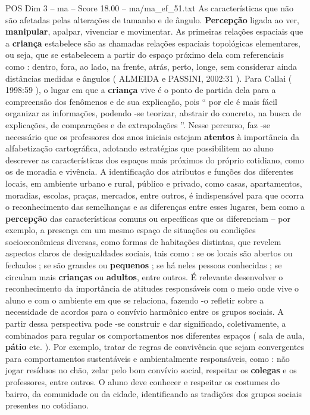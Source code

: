 \begin{textsample}{POS Dim 3 – ma – Score 18.00 – ma/ma\_ef\_51.txt}
As características que não são afetadas pelas alterações de tamanho e de ângulo. \textbf{Percepção} ligada ao ver, \textbf{manipular}, apalpar, vivenciar e movimentar.
As primeiras relações espaciais que a \textbf{criança} estabelece são as chamadas relações espaciais topológicas elementares, ou seja, que se estabelecem a partir do espaço próximo dela com referenciais como : dentro, fora, ao lado, na frente, atrás, perto, longe, sem considerar ainda distâncias medidas e ângulos ( ALMEIDA e PASSINI, 2002:31 ).
Para Callai ( 1998:59 ), o lugar em que a \textbf{criança} vive é o ponto de partida dela para a compreensão dos fenômenos e de sua explicação, pois “ por ele é mais fácil organizar as informações, podendo -se teorizar, abstrair do concreto, na busca de explicações, de comparações e de extrapolações ”.
Nesse percurso, faz -se necessário que os professores dos anos iniciais estejam \textbf{atentos} à importância da alfabetização cartográfica, adotando estratégias que possibilitem ao aluno descrever as características dos espaços mais próximos do próprio cotidiano, como os de moradia e vivência.
A identificação dos atributos e funções dos diferentes locais, em ambiente urbano e rural, público e privado, como casas, apartamentos, moradias, escolas, praças, mercados, entre outros, é indispensável para que ocorra o reconhecimento das semelhanças e as diferenças entre esses lugares, bem como a \textbf{percepção} das características comuns ou específicas que os diferenciam – por exemplo, a presença em um mesmo espaço de situações ou condições socioeconômicas diversas, como formas de habitações distintas, que revelem aspectos claros de desigualdades sociais, tais como : se os locais são abertos ou fechados ; se são grandes ou \textbf{pequenos} ; se há neles pessoas conhecidas ; se circulam mais \textbf{crianças} ou \textbf{adultos}, entre outros.
É relevante desenvolver o reconhecimento da importância de atitudes responsáveis com o meio onde vive o aluno e com o ambiente em que se relaciona, fazendo -o refletir sobre a necessidade de acordos para o convívio harmônico entre os grupos sociais.
A partir dessa perspectiva pode -se construir e dar significado, coletivamente, a combinados para regular os comportamentos nos diferentes espaços ( sala de aula, \textbf{pátio} etc. ).
Por exemplo, tratar de regras de convivência que sejam convergentes para comportamentos sustentáveis e ambientalmente responsáveis, como : não jogar resíduos no chão, zelar pelo bom convívio social, respeitar os \textbf{colegas} e os professores, entre outros.
O aluno deve conhecer e respeitar os costumes do bairro, da comunidade ou da cidade, identificando as tradições dos grupos sociais presentes no cotidiano.

\end{textsample}
